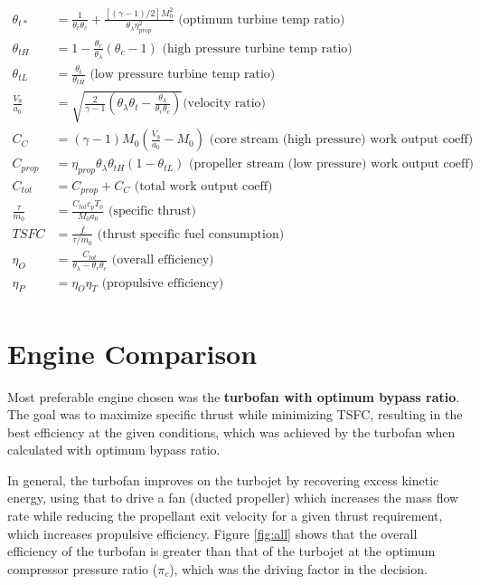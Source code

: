 \documentclass[]{aiaa-tc}%
\begin{document}
\begin{align*}
	\theta_{t*} &= \frac{1}{\theta_{r}\theta_{c}} + \frac{[(\gamma-1)/2]M_{0}^{2}
		}{\theta_{\lambda}\eta_{prop}^{2}} \text{ (optimum turbine temp ratio)}\\
	\theta_{tH} &= 1 - \frac{\theta_{r}}{\theta_{\lambda}}(\theta_{c}-1)
		\text{ (high pressure turbine temp ratio)}\\
	\theta_{tL} &= \frac{\theta_{t}}{\theta_{tH}} \text{ (low pressure turbine temp ratio)}\\
	\frac{V_{9}}{a_{0}} &= \sqrt{\frac{2}{\gamma-1}\left(\theta_{\lambda}\theta_{t}-
		\frac{\theta_{\lambda}}{\theta_{r}\theta_{c}} \right) } \text{(velocity ratio)}\\
	C_{C} &= (\gamma-1)M_{0}\left(\frac{V_{9}}{a_{0}}-M_{0}\right)
		\text{ (core stream (high pressure) work output coeff)}\\
	C_{prop} &= \eta_{prop}\theta_{\lambda}\theta_{tH}(1-\theta_{tL})
		\text{ (propeller stream (low pressure) work output coeff)}\\
	C_{tot} &= C_{prop} + C_{C} \text{ (total work output coeff)}\\
	\frac{\tau}{\dot{m}_{0}} &= \frac{C_{tot}c_{p}T_{0}}{M_{0}a_{0}} \text{ (specific thrust)}\\
	TSFC &= \frac{f}{\tau/\dot{m}_{0}} \text{ (thrust specific fuel consumption)}\\
	\eta_{O} &= \frac{C_{tot}}{\theta_{\lambda}-\theta_{r}\theta_{c}}
		\text{ (overall efficiency)}\\
	\eta_{P} &= \eta_{O}\eta_{T} \text{ (propulsive efficiency)}\\
\end{align*}

\newpage

\section{Engine Comparison}

Most preferable engine chosen was the \textbf{turbofan with optimum bypass ratio}.  The goal was to maximize specific thrust while minimizing TSFC, resulting in the best efficiency at the given conditions, which was achieved by the turbofan when calculated with optimum bypass ratio.
\bigskip

In general, the turbofan improves on the turbojet by recovering excess kinetic energy, using that to drive a fan (ducted propeller) which increases the mass flow rate while reducing the propellant exit velocity for a given thrust requirement, which increases propulsive efficiency.  Figure \ref{fig:all} shows that the overall efficiency of the turbofan is greater than that of the turbojet at the optimum compressor pressure ratio ($\pi_{c}$), which was the driving factor in the decision.
\end{document}
